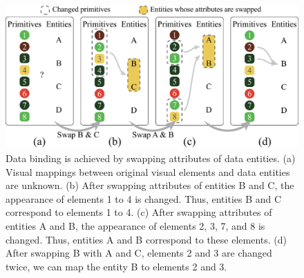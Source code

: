 \begin{figure}
    \centering
    \includegraphics[width=1\columnwidth]{figures/DataBinding.eps}
    \caption{Data binding is achieved by swapping attributes of data entities. (a) Visual mappings between original visual elements and data entities are unknown. (b) After swapping attributes of entities B and C, the appearance of elements 1 to 4 is changed. Thus, entities B and C correspond to elements 1 to 4. (c) After swapping attributes of entities A and B, the appearance of elements 2, 3, 7, and 8 is changed. Thus, entities A and B correspond to these elements. (d) After swapping B with A and C, elements 2 and 3 are changed twice, we can map the entity B to elements 2 and 3.}
    \label{fig:DataBinding}
\end{figure}


